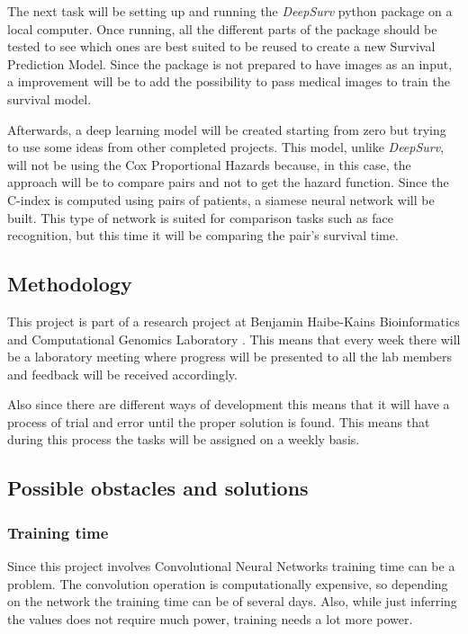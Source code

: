 The next task will be setting up and running the \emph{DeepSurv} python package on a local
computer. Once running, all the different parts of the package should be tested to see which
ones are best suited to be reused to create a new Survival Prediction Model. Since the package
is not prepared to have images as an input, a improvement will be to add the possibility to 
pass medical images to train the survival model.
\cite{medical:deep-surv-github}

Afterwards, a deep learning model will be created starting from zero but trying to use 
some ideas from other completed projects. This model, unlike \emph{DeepSurv}, will not be 
using the Cox Proportional Hazards because, in this case, the approach will be to compare
pairs and not to get the hazard function. Since the C-index is computed using pairs of patients, 
a siamese neural network will be built. This type of network is suited for comparison 
tasks such as face recognition, but this time it will be comparing the pair's survival time.

\subsection{Methodology}

This project is part of a research project at Benjamin Haibe-Kains Bioinformatics and 
Computational Genomics Laboratory \cite{bhklab}. This means that every week there will be a 
laboratory meeting where progress will be presented to all the lab members and feedback will 
be received accordingly.

Also since there are different ways of development this means that it will have a process of trial
and error until the proper solution is found. This means that during this process the
tasks will be assigned on a weekly basis.


\subsection{Possible obstacles and solutions}

\subsubsection{Training time}

Since this project involves Convolutional Neural Networks training time can be a problem. 
The convolution operation is computationally expensive, so depending on the network the 
training time can be of several days. Also, while just inferring the values does not require
much power, training needs a lot more power. 


